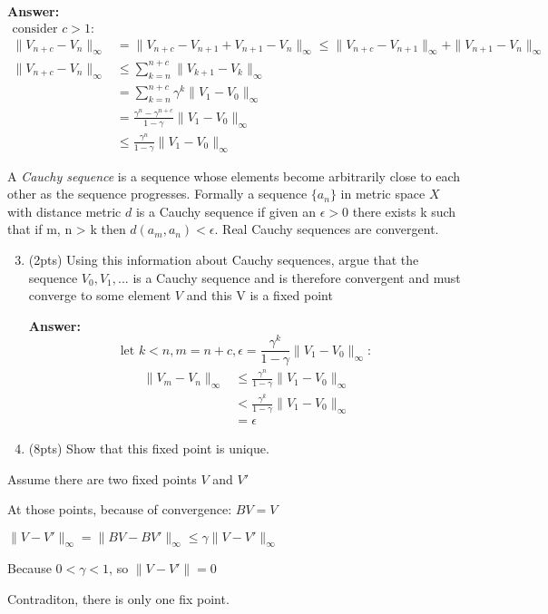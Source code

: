 \textbf{Answer:}
\begin{equation}
\begin{aligned}
\text{consider } c > 1: &\\
\|V_{n+c} - V_n\|_\infty & = \|V_{n+c} - V_{n+1} + V_{n+1} - V_n\|_\infty \leq  \|V_{n+c} - V_{n+1}\|_\infty + \|V_{n+1} - V_n\|_\infty \\
\|V_{n+c} - V_n\|_\infty  & \leq \sum_{k=n}^{n+c}  \|V_{k+1} - V_k\|_\infty \\
                          & = \sum_{k=n}^{n+c} \gamma^k \|V_{1} - V_0\|_\infty \\
                          & = \frac{\gamma^n - \gamma^{n+c}}{1-\gamma}\|V_{1} - V_0\|_\infty \\
                          & \leq \frac{\gamma^n}{1-\gamma}\|V_{1} - V_0\|_\infty
\end{aligned}
\end{equation}

A \emph{Cauchy sequence} is a sequence whose elements become arbitrarily close to each other as the sequence progresses. Formally a sequence $\{a_n\}$ in metric space $X$ with distance metric $d$ is a Cauchy sequence if given an $\epsilon > 0$ there exists k such that if m, n > k then $d(a_m, a_n) < \epsilon$. Real Cauchy sequences are convergent.
\begin{enumerate}[label=(\alph*)]
\setcounter{enumi}{2}
\item (2pts) Using this information about Cauchy sequences, argue that the sequence $V_0, V_1, ...$ is a Cauchy sequence and is therefore convergent and must converge to some element $V$ and this V is a fixed point

\textbf{Answer:}
\begin{equation}
\text{let } k < n, m = n + c, \epsilon = \frac{\gamma^k}{1-\gamma}\|V_{1} - V_0\|_\infty:
\end{equation}
\begin{equation}
\begin{aligned}
\|V_{m} - V_n\|_\infty  & \leq \frac{\gamma^n}{1-\gamma}\|V_{1} - V_0\|_\infty \\
                          & < \frac{\gamma^k}{1-\gamma}\|V_{1} - V_0\|_\infty \\
                          & = \epsilon
\end{aligned}
\end{equation}

\item (8pts) Show that this fixed point is unique.

\end{enumerate}

Assume there are two fixed points $V$ and $V'$

At those points, because of convergence: $BV = V$

$\|V - V'\|_\infty = \|BV - BV'\|_\infty \leq \gamma \|V - V'\|_\infty$

Because $ 0 < \gamma < 1$, so $\|V - V'\| = 0$

Contraditon, there is only one fix point.
